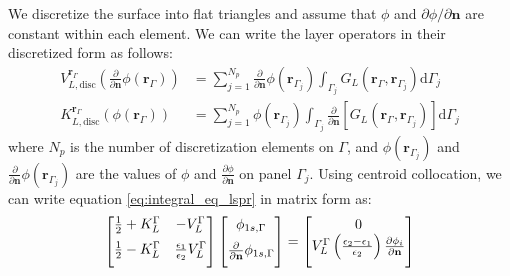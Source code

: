 We discretize the surface into flat triangles and assume that  $\phi$ and 
$\partial \phi/\partial \mathbf{n}$ are constant within each element. We can
write the layer operators in their discretized form as follows:
%
\begin{align} \label{eq:layers_disc}
V_{L,\text{disc}}^{\mathbf{r}_\Gamma} \left( \frac{\partial}{\partial \mathbf{n}} \phi(\mathbf{r}_{\Gamma}) \right) &= \sum_{j=1}^{N_p} \frac{\partial}{\partial \mathbf{n}} \phi(\mathbf{r}_{\Gamma_j}) \int_{\Gamma_j} G_L(\mathbf{r}_\Gamma,\mathbf{r}_{\Gamma_j})  \mathrm{d} \Gamma_j  \nonumber \\
K_{L,\text{disc}}^{\mathbf{r}_\Gamma}(\phi(\mathbf{r}_{\Gamma})) &=  \sum_{j=1}^{N_p}\phi(\mathbf{r}_{\Gamma_j})\int_{\Gamma_j} \frac{\partial}{\partial \mathbf{n}} \left[ G_L(\mathbf{r}_\Gamma,\mathbf{r}_{\Gamma_j}) \right]\mathrm{d} \Gamma_j
\end{align}
%
where $N_p$ is the number of discretization elements on $\Gamma$, 
and $\phi(\mathbf{r}_{\Gamma_j})$ and $\frac{\partial}{\partial \mathbf{n}} 
\phi(\mathbf{r}_{\Gamma_j})$ are the values of $\phi$ and 
$\frac{\partial \phi}{\partial \mathbf{n}}$ on panel $\Gamma_j$.
Using centroid collocation, we can write equation \eqref{eq:integral_eq_lspr} in matrix form as:
%
 \begin{equation} \label{eq:matrix_lspr}
 \left[
    \begin{matrix} 
       \frac{1}{2} + K_{L}^{\Gamma} & -V_{L}^{\Gamma}  \vspace{0.2cm} \\
       \frac{1}{2} - K_{L}^{\Gamma} &  \frac{\epsilon_1}{\epsilon_2} V_{L}^{\Gamma}  \vspace{0.2cm} 
    \end{matrix}
    \right] \left[ 
    \begin{matrix} 
       \phi_{1s,\Gamma} \vspace{0.2cm} \\
       \frac{\partial}{\partial \mathbf{n}} \phi_{1s,\Gamma} \vspace{0.2cm}
    \end{matrix} 
     \right] =   
    \left[
    \begin{matrix} 
       0 \\
       V_{L}^{\Gamma} \left(\frac{\epsilon_2-\epsilon_1}{\epsilon_2}\right) \frac{\partial\phi_i}{\partial\mathbf{n}} \vspace{0.2cm} 
    \end{matrix}
    \right]
 \end{equation}
